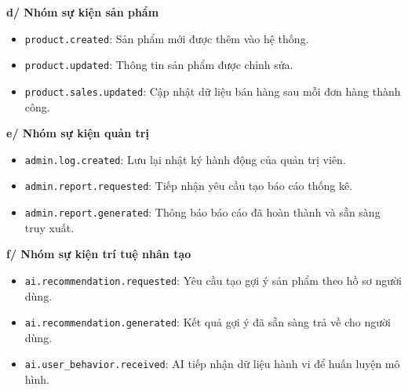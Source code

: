 \textbf{d/ Nhóm sự kiện sản phẩm}
\begin{itemize}
    \item \texttt{product.created}: Sản phẩm mới được thêm vào hệ thống.
    \item \texttt{product.updated}: Thông tin sản phẩm được chỉnh sửa.
    \item \texttt{product.sales.updated}: Cập nhật dữ liệu bán hàng sau mỗi đơn hàng thành công.
\end{itemize}

\textbf{e/ Nhóm sự kiện quản trị}
\begin{itemize}
    \item \texttt{admin.log.created}: Lưu lại nhật ký hành động của quản trị viên.
    \item \texttt{admin.report.requested}: Tiếp nhận yêu cầu tạo báo cáo thống kê.
    \item \texttt{admin.report.generated}: Thông báo báo cáo đã hoàn thành và sẵn sàng truy xuất.
\end{itemize}

\textbf{f/ Nhóm sự kiện trí tuệ nhân tạo}
\begin{itemize}
    \item \texttt{ai.recommendation.requested}: Yêu cầu tạo gợi ý sản phẩm theo hồ sơ người dùng.
    \item \texttt{ai.recommendation.generated}: Kết quả gợi ý đã sẵn sàng trả về cho người dùng.
    \item \texttt{ai.user\_behavior.received}: AI tiếp nhận dữ liệu hành vi để huấn luyện mô hình.
\end{itemize}